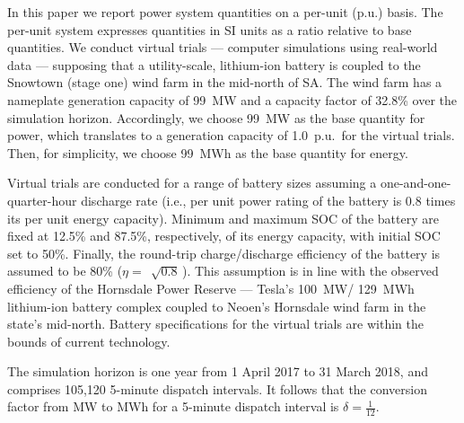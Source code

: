 \documentclass[a4paper, 10pt, twocolumn, preprint, 3p]{elsarticle}
\newcommand{\sqrts}[2][]{\,\sqrt[#1]{#2}\,}
\def\mwmwh{\delta}
\def\eff{\eta}
\begin{document}
In this paper we report power system quantities on a per-unit (p.u.) basis.  The per-unit system expresses quantities in SI units as a ratio relative to base quantities.  We conduct virtual trials --- computer simulations using real-world data --- supposing that a utility-scale, lithium-ion battery is coupled to the Snowtown (stage one) wind farm in the mid-north of SA.  The wind farm has a nameplate generation capacity of 99~MW and a capacity factor of 32.8\% over the simulation horizon.  Accordingly, we choose 99~MW as the base quantity for power, which translates to a generation capacity of 1.0~p.u.\ for the virtual trials.  Then, for simplicity, we choose 99~MWh as the base quantity for energy.

Virtual trials are conducted for a range of battery sizes assuming a one-and-one-quarter-hour discharge rate (i.e., per unit power rating of the battery is 0.8 times its per unit energy capacity).  Minimum and maximum SOC of the battery are fixed at 12.5\% and 87.5\%, respectively, of its energy capacity, with initial SOC set to 50\%.  Finally, the round-trip charge/discharge efficiency of the battery is assumed to be 80\% ($\eff = \sqrts{0.8}$).  This assumption is in line with the observed efficiency of the Hornsdale Power Reserve --- Tesla's 100~MW/ 129~MWh lithium-ion battery complex coupled to Neoen's Hornsdale wind farm in the state's mid-north.  Battery specifications for the virtual trials are within the bounds of current technology.

The simulation horizon is one year from 1 April 2017 to 31 March 2018, and comprises 105,120 5-minute dispatch intervals.   It follows that the conversion factor from MW to MWh for a 5-minute dispatch interval is $\mwmwh = \tfrac{1}{12}$.
\end{document}
